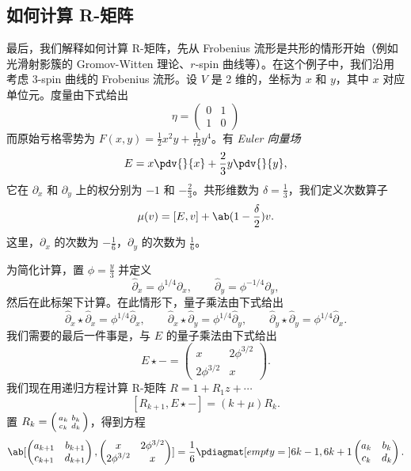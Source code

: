 \subsection{如何计算 R-矩阵}%
\label{sub:How to compute the R-matrix}

最后，我们解释如何计算 R-矩阵，先从 Frobenius 流形是共形的情形开始（例如光滑射影簇的 Gromov-Witten 理论、\(r\)-spin 曲线等）。在这个例子中，我们沿用~\cite{PPZ2015} 考虑 3-spin 曲线的 Frobenius 流形。设 \(V\) 是 2 维的，坐标为 \(x\) 和 \(y\)，其中 \(x\) 对应单位元。度量由下式给出
\[ \eta = \begin{pmatrix}
    0 & 1 \\
    1 & 0
\end{pmatrix} \]
而原始亏格零势为 \(F(x,y) = \frac{1}{2} x^2 y + \frac{1}{72} y^4\)。有 \textit{Euler 向量场}
\[ E = x \pdv{}{x} + \frac{2}{3} y \pdv{}{y}, \]
它在 \(\partial_x\) 和 \(\partial_y\) 上的权分别为 \(-1\) 和 \(-\frac{2}{3}\)。共形维数为 \(\delta = \frac{1}{3}\)，我们定义次数算子
\[ \mu(v) = [E,v] + \ab(1 - \frac{\delta}{2})v. \]
这里，\(\partial_x\) 的次数为 \(-\frac{1}{6}\)，\(\partial_y\) 的次数为 \(\frac{1}{6}\)。

为简化计算，置 \(\phi = \frac{y}{3}\) 并定义
\[ \hat{\partial}_x = \phi^{1/4} \partial_x, \qquad \hat{\partial}_y = \phi^{-1/4} \partial_y, \]
然后在此标架下计算。在此情形下，量子乘法由下式给出
\[ \hat{\partial}_x \star \hat{\partial}_x = \phi^{1/4} \hat{\partial}_x, \qquad \hat{\partial}_x \star \hat{\partial}_y = \phi^{1/4} \hat{\partial}_y, \qquad \hat{\partial}_y \star \hat{\partial}_y = \phi^{1/4} \hat{\partial}_x. \]
我们需要的最后一件事是，与 \(E\) 的量子乘法由下式给出
\[ E \star - = \begin{pmatrix}
    x & 2 \phi^{3/2} \\
    2 \phi^{3/2} & x 
\end{pmatrix}. \]
我们现在用递归方程计算 R-矩阵 \(R = 1 + R_1 z + \cdots\)
\[ [R_{k+1}, E \star -] = (k + \mu) R_k. \]
置 \(R_k = \begin{psmallmatrix}
    a_k & b_k \\
    c_k & d_k
\end{psmallmatrix}\)，得到方程
\[ \ab[
    \begin{pmatrix}
        a_{k+1} & b_{k+1} \\
        c_{k+1} & d_{k+1}
    \end{pmatrix}, \begin{pmatrix}
        x & 2 \phi^{3/2} \\
        2 \phi^{3/2} & x 
    \end{pmatrix}
] = \frac{1}{6} \pdiagmat[empty={}]{6k-1, 6k+1} \begin{pmatrix}
    a_k & b_k \\
    c_k & d_k 
\end{pmatrix}. \]

